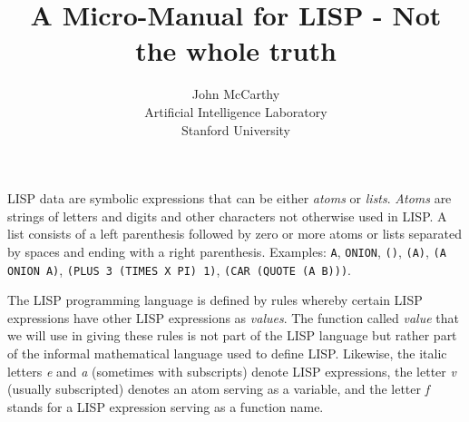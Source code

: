 \documentclass[10pt,a4paper,twocolumn]{article}
\title{A Micro-Manual for LISP - Not the whole truth}
\author{John McCarthy\\
  Artificial Intelligence Laboratory\\
  Stanford University}
\date{}
\begin{document}
\maketitle


LISP data are symbolic expressions that can be either \textit{atoms} or
\textit{lists}. \textit{Atoms} are strings of letters and digits and other
characters not otherwise used in LISP. A list consists of a left parenthesis
followed by zero or more atoms or lists separated by spaces and ending with a
right parenthesis. Examples: \texttt{A}, \texttt{ONION}, \texttt{()},
\texttt{(A)}, \texttt{(A ONION A)}, \texttt{(PLUS 3 (TIMES X PI) 1)},
\texttt{(CAR (QUOTE (A B)))}.

The LISP programming language is defined by rules whereby certain LISP
expressions have other LISP expressions as \textit{values}. The function called
\textit{value} that we will use in giving these rules is not part of the LISP
language but rather part of the informal mathematical language used to define
LISP. Likewise, the italic letters \textit{e} and \textit{a} (sometimes with
subscripts) denote LISP expressions, the letter \textit{v} (usually subscripted)
denotes an atom serving as a variable, and the letter \textit{f} stands for a
LISP expression serving as a function name.
\end{document}

